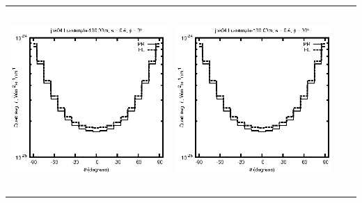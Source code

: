 \begin{tabular}{c c c c}
\includegraphics[height=7cm]{../eps/jok04_Lu_sample_100.00m_fwd.eps} &
\includegraphics[height=7cm]{../eps/jok04_Lu_sample_100.00m_cross.eps} \\
\end{tabular}

\pagebreak

